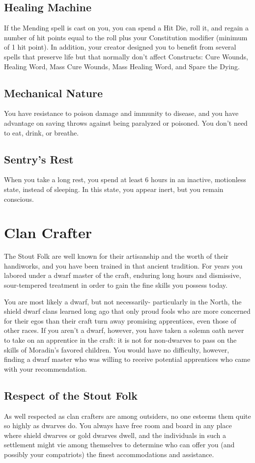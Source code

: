 \documentclass[letterpaper,openany,oneside,twocolumn]{book}
\begin{document}
\subsection*{Healing Machine}
If the Mending spell is cast on you, you can spend a Hit Die, roll it, and regain a number of hit points equal to the roll plus your Constitution modifier (minimum of 1 hit point). In addition, your creator designed you to benefit from several spells that preserve life but that normally don't affect Constructs: Cure Wounds, Healing Word, Mass Cure Wounds, Mass Healing Word, and Spare the Dying.
\subsection*{Mechanical Nature}
You have resistance to poison damage and immunity to disease, and you have advantage on saving throws against being paralyzed or poisoned. You don't need to eat, drink, or breathe.
\subsection*{Sentry's Rest}
When you take a long rest, you spend at least 6 hours in an inactive, motionless state, instead of sleeping. In this state, you appear inert, but you remain conscious.

\section*{Clan Crafter}
The Stout Folk are well known for their artisanship and the worth of their handiworks, and you have been trained in that ancient tradition. For years you labored under a dwarf master of the craft, enduring long hours and dismissive, sour-tempered treatment in order to gain the fine skills you possess today.

You are most likely a dwarf, but not necessarily- particularly in the North, the shield dwarf clans learned long ago that only proud fools who are more concerned for their egos than their craft turn away promising apprentices, even those of other races. If you aren't a dwarf, however, you have taken a solemn oath never to take on an apprentice in the craft: it is not for non-dwarves to pass on the skills of Moradin's favored children. You would have no difficulty, however, finding a dwarf master who was willing to receive potential apprentices who came with your recommendation.
\subsection*{Respect of the Stout Folk}
As well respected as clan crafters are among outsiders, no one esteems them quite so highly as dwarves do. You always have free room and board in any place where shield dwarves or gold dwarves dwell, and the individuals in such a settlement might vie among themselves to determine who can offer you (and possibly your compatriots) the finest accommodations and assistance.
\end{document}
